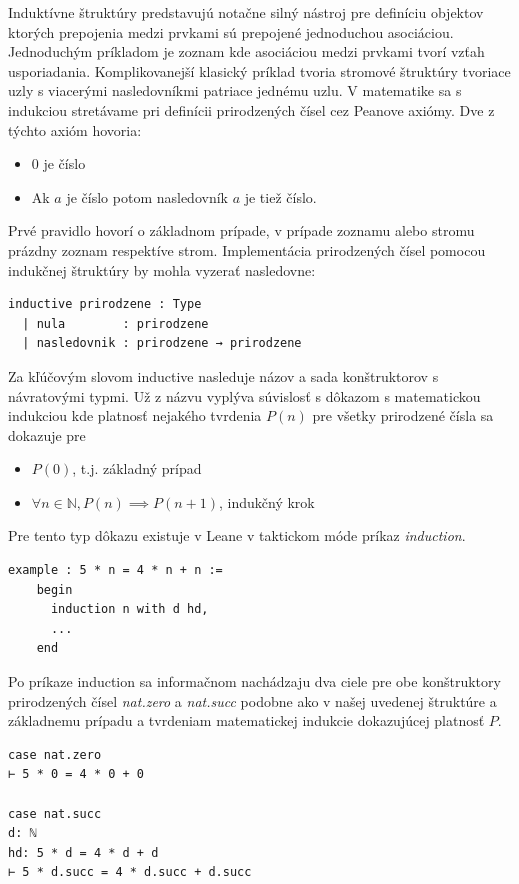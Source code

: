 \documentclass[a4paper,10pt,oneside]{report}%
\begin{document}
    Induktívne štruktúry predstavujú notačne silný nástroj pre definíciu objektov
ktorých prepojenia medzi prvkami sú prepojené jednoduchou asociáciou.
    Jednoduchým príkladom je zoznam kde asociáciou medzi prvkami tvorí vzťah
usporiadania.
    Komplikovanejší klasický príklad tvoria stromové štruktúry tvoriace uzly
s viacerými nasledovníkmi patriace jednému uzlu.
    V matematike sa s indukciou stretávame pri definícii prirodzených čísel
cez Peanove axiómy.
    Dve z týchto axióm hovoria:
\begin{itemize}
    \item 0 je číslo
    \item Ak $a$ je číslo potom nasledovník $a$ je tiež číslo.
\end{itemize}
    Prvé pravidlo hovorí o základnom prípade, v prípade zoznamu alebo stromu prázdny
zoznam respektíve strom.
    Implementácia prirodzených čísel pomocou indukčnej štruktúry by mohla vyzerať
nasledovne:
\begin{lstlisting}
inductive prirodzene : Type
  | nula        : prirodzene
  | nasledovnik : prirodzene → prirodzene
\end{lstlisting}
    Za kľúčovým slovom inductive nasleduje názov a sada konštruktorov s návratovými
typmi.
    Už z názvu vyplýva súvislosť s dôkazom s matematickou indukciou kde platnosť
nejakého tvrdenia $P(n)$ pre všetky prirodzené čísla sa dokazuje pre
\begin{itemize}
    \item $P(0)$, t.j. základný prípad
    \item $\forall n \in \mathbb{N}, P(n) \implies P(n+1)$, indukčný krok
\end{itemize}
    Pre tento typ dôkazu existuje v Leane v taktickom móde príkaz \emph{induction}.
\begin{lstlisting}
example : 5 * n = 4 * n + n :=
    begin
      induction n with d hd,
      ...
    end
\end{lstlisting}
    Po príkaze induction sa informačnom nachádzaju dva ciele pre obe konštruktory
prirodzených čísel \emph{nat.zero} a \emph{nat.succ} podobne ako v našej uvedenej
štruktúre a základnemu prípadu a tvrdeniam matematickej indukcie dokazujúcej platnosť
$P$.
\begin{lstlisting}
case nat.zero
⊢ 5 * 0 = 4 * 0 + 0

case nat.succ
d: ℕ
hd: 5 * d = 4 * d + d
⊢ 5 * d.succ = 4 * d.succ + d.succ
\end{lstlisting}
\end{document}
